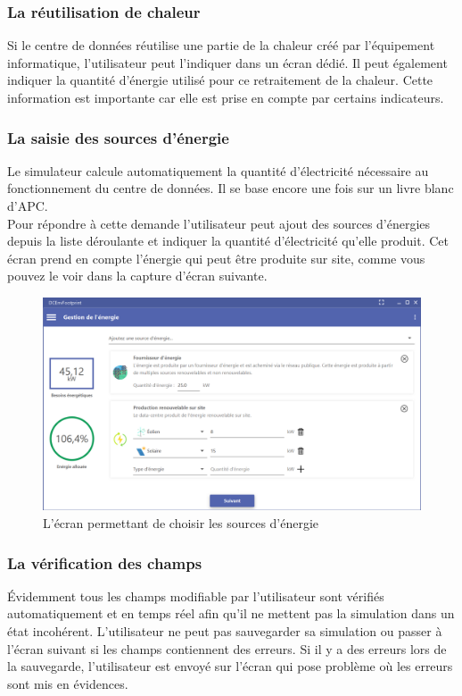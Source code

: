 \subsubsection{La réutilisation de chaleur}
Si le centre de données réutilise une partie de la chaleur créé par l'équipement informatique, l'utilisateur peut l'indiquer dans un écran dédié. Il peut également indiquer la quantité d'énergie utilisé pour ce retraitement de la chaleur. Cette information est importante car elle est prise en compte par certains indicateurs.

\subsubsection{La saisie des sources d'énergie}
Le simulateur calcule automatiquement la quantité d'électricité nécessaire au fonctionnement du centre de données. Il se base encore une fois sur un livre blanc d'APC.\\
Pour répondre à cette demande l'utilisateur peut ajout des sources d'énergies depuis la liste déroulante et indiquer la quantité d'électricité qu'elle produit. Cet écran prend en compte l'énergie qui peut être produite sur site, comme vous pouvez le voir dans la capture d'écran suivante.

\begin{figure}[h!]
	\begin{center}
		\includegraphics[scale=0.5]{partie3/images/energie.png}
		\caption{L'écran permettant de choisir les sources d'énergie}
	\end{center}
\end{figure}

\subsubsection{La vérification des champs}
Évidemment tous les champs modifiable par l'utilisateur sont vérifiés automatiquement et en temps réel afin qu'il ne mettent pas la simulation dans un état incohérent. L'utilisateur ne peut pas sauvegarder sa simulation ou passer à l'écran suivant si les champs contiennent des erreurs. Si il y a des erreurs lors de la sauvegarde, l'utilisateur est envoyé sur l'écran qui pose problème où les erreurs sont mis en évidences.

